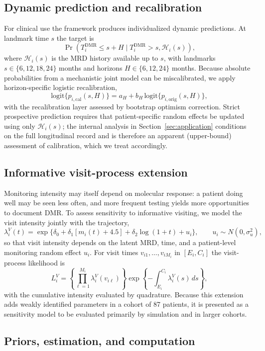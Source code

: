 \documentclass[11pt]{article}
\begin{document}
\subsection{Dynamic prediction and recalibration}
\label{sec:dynamic}

For clinical use the framework produces individualized dynamic
predictions. At landmark time $s$ the target is
\[
\Pr(T_i^{\mathrm{DMR}}\le s+H\mid T_i^{\mathrm{DMR}}>s,\mathcal H_i(s)),
\]
where $\mathcal H_i(s)$ is the MRD history available up to $s$, with
landmarks $s\in\{6,12,18,24\}$ months and horizons $H\in\{6,12,24\}$
months. Because absolute probabilities from a mechanistic joint model can
be miscalibrated, we apply horizon-specific logistic recalibration,
\[
\mathrm{logit}\{p_{i,\mathrm{cal}}(s,H)\}
=a_H+b_H\,\mathrm{logit}\{p_{i,\mathrm{orig}}(s,H)\},
\]
with the recalibration layer assessed by bootstrap optimism correction.
Strict prospective prediction requires that patient-specific random
effects be updated using only $\mathcal H_i(s)$; the internal analysis in
Section~\ref{sec:application} conditions on the full longitudinal record
and is therefore an apparent (upper-bound) assessment of calibration,
which we treat accordingly.

\subsection{Informative visit-process extension}
\label{sec:visit}

Monitoring intensity may itself depend on molecular response: a patient
doing well may be seen less often, and more frequent testing yields more
opportunities to document DMR. To assess sensitivity to informative
visiting, we model the visit intensity jointly with the trajectory,
\[
\lambda_i^V(t)=
\exp\{\delta_0+\delta_1[m_i(t)+4.5]+\delta_2\log(1+t)+u_i\},
\qquad u_i\sim N(0,\sigma_u^2),
\]
so that visit intensity depends on the latent MRD, time, and a
patient-level monitoring random effect $u_i$. For visit times
$v_{i1},\ldots,v_{iM_i}$ in $[E_i,C_i]$ the visit-process likelihood is
\[
L_i^V=
\left\{\prod_{\ell=1}^{M_i}\lambda_i^V(v_{i\ell})\right\}
\exp\left\{-\int_{E_i}^{C_i}\lambda_i^V(s)\,ds\right\},
\]
with the cumulative intensity evaluated by quadrature. Because this
extension adds weakly identified parameters in a cohort of 87 patients, it
is presented as a sensitivity model to be evaluated primarily by
simulation and in larger cohorts.

\subsection{Priors, estimation, and computation}
\label{sec:computation}
\end{document}
